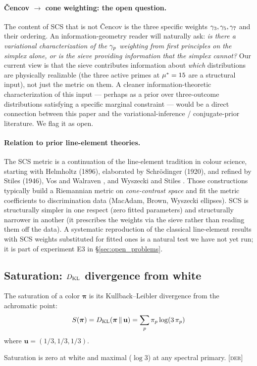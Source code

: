 \documentclass[12pt,a4paper]{article}
\begin{document}
\paragraph{Čencov $\to$ cone weighting: the open question.}
The content of SCS that is not \v{C}encov is the three specific
weights $\gamma_{3}, \gamma_{5}, \gamma_{7}$ and their ordering. An
information-geometry reader will naturally ask: \emph{is there a
variational characterization of the $\gamma_{p}$ weighting from first
principles on the simplex alone, or is the sieve providing information
that the simplex cannot?} Our current view is that the sieve
contributes information about \emph{which} distributions are physically
realizable (the three active primes at ${\mu^{*}} = 15$ are a structural
input), not just the metric on them. A cleaner information-theoretic
characterization of this input --- perhaps as a prior over three-outcome
distributions satisfying a specific marginal constraint --- would be
a direct connection between this paper and the
variational-inference / conjugate-prior literature. We flag it as
open.

\paragraph{Relation to prior line-element theories.}
The SCS metric is a continuation of the line-element tradition in
colour science, starting with Helmholtz (1896), elaborated by
Schrödinger (1920), and refined by Stiles (1946), Vos and Walraven
\cite{voswalraven1972}, and Wyszecki and Stiles \cite{wyszecki2000}.
Those constructions typically build a Riemannian metric on
\emph{cone-contrast space} and fit the metric coefficients to
discrimination data (MacAdam, Brown, Wyszecki ellipses). SCS is
structurally simpler in one respect (zero fitted parameters) and
structurally narrower in another (it prescribes the weights via the
sieve rather than reading them off the data). A systematic
reproduction of the classical line-element results with SCS weights
substituted for fitted ones is a natural test we have not yet run;
it is part of experiment E3 in \S\ref{sec:open_problems}.

\subsection{Saturation: $D_{\mathrm{KL}}$ divergence from white}

\begin{derivedbox}
The saturation of a color $\bm{\pi}$ is its Kullback--Leibler
divergence from the achromatic point:
\begin{equation}
  S(\bm{\pi}) = D_{\mathrm{KL}}(\bm{\pi} \,\|\, \mathbf{u})
    = \sum_{p} \pi_p \log(3\,\pi_p)
  \label{eq:saturation}
\end{equation}
where $\mathbf{u} = (1/3, 1/3, 1/3)$.

Saturation is zero at white and maximal ($\log 3$) at any spectral
primary. \textsc{[der]}
\end{derivedbox}
\end{document}
